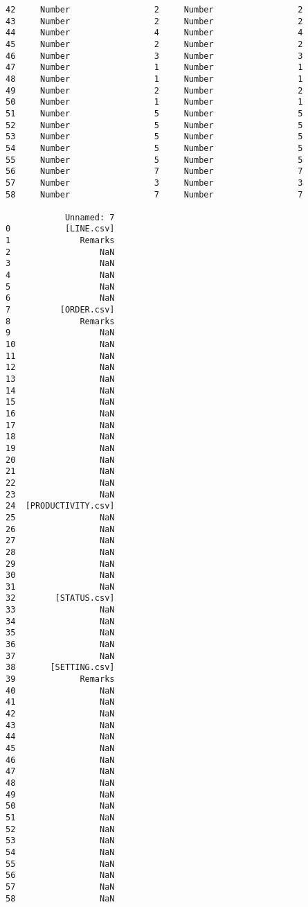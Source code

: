 \documentclass[11pt]{article}
\makeatletter
\newcommand{\boxspacing}{\kern\kvtcb@left@rule\kern\kvtcb@boxsep}
\newcommand{\prompt}[4]{
        {\ttfamily\llap{{\color{#2}[#3]:\hspace{3pt}#4}}\vspace{-\baselineskip}}
    }
\makeatother
\begin{document}
\begin{Verbatim}[commandchars=\\\{\}]
42     Number                 2     Number                 2
43     Number                 2     Number                 2
44     Number                 4     Number                 4
45     Number                 2     Number                 2
46     Number                 3     Number                 3
47     Number                 1     Number                 1
48     Number                 1     Number                 1
49     Number                 2     Number                 2
50     Number                 1     Number                 1
51     Number                 5     Number                 5
52     Number                 5     Number                 5
53     Number                 5     Number                 5
54     Number                 5     Number                 5
55     Number                 5     Number                 5
56     Number                 7     Number                 7
57     Number                 3     Number                 3
58     Number                 7     Number                 7

            Unnamed: 7
0           [LINE.csv]
1              Remarks
2                  NaN
3                  NaN
4                  NaN
5                  NaN
6                  NaN
7          [ORDER.csv]
8              Remarks
9                  NaN
10                 NaN
11                 NaN
12                 NaN
13                 NaN
14                 NaN
15                 NaN
16                 NaN
17                 NaN
18                 NaN
19                 NaN
20                 NaN
21                 NaN
22                 NaN
23                 NaN
24  [PRODUCTIVITY.csv]
25                 NaN
26                 NaN
27                 NaN
28                 NaN
29                 NaN
30                 NaN
31                 NaN
32        [STATUS.csv]
33                 NaN
34                 NaN
35                 NaN
36                 NaN
37                 NaN
38       [SETTING.csv]
39             Remarks
40                 NaN
41                 NaN
42                 NaN
43                 NaN
44                 NaN
45                 NaN
46                 NaN
47                 NaN
48                 NaN
49                 NaN
50                 NaN
51                 NaN
52                 NaN
53                 NaN
54                 NaN
55                 NaN
56                 NaN
57                 NaN
58                 NaN
    \end{Verbatim}

    \begin{tcolorbox}[breakable, size=fbox, boxrule=1pt, pad at break*=1mm,colback=cellbackground, colframe=cellborder]
\prompt{In}{incolor}{ }{\boxspacing}
\begin{Verbatim}[commandchars=\\\{\}]

\end{Verbatim}
\end{tcolorbox}


    
    
    
\end{document}
